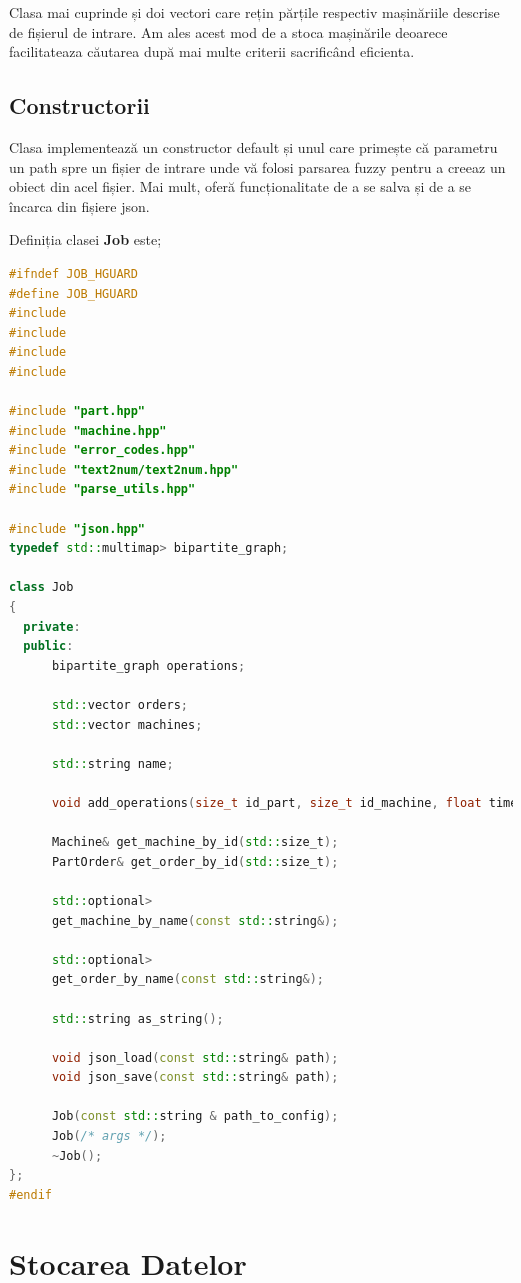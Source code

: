 \documentclass[12pt, twoside]{article}
\begin{document}
Clasa mai cuprinde și doi vectori care rețin părțile respectiv
mașinăriile descrise de fișierul de intrare. Am ales acest mod
de a stoca mașinările deoarece facilitateaza căutarea după mai
multe criterii sacrificând eficienta.

\subsection{Constructorii}

Clasa implementează un constructor default și unul care
primește că parametru un path spre un fișier de intrare
unde vă folosi parsarea fuzzy pentru a creeaz un obiect
din acel fișier. Mai mult, oferă funcționalitate de a se salva
și de a se încarca din fișiere json.


Definiția clasei \textbf{Job} este;

\begin{lstlisting}[language={C++},breaklines,frame={single}]
#ifndef JOB_HGUARD
#define JOB_HGUARD
#include 
#include 
#include 
#include 

#include "part.hpp"
#include "machine.hpp"
#include "error_codes.hpp"
#include "text2num/text2num.hpp"
#include "parse_utils.hpp"

#include "json.hpp"
typedef std::multimap> bipartite_graph;

class Job
{
  private:
  public:
      bipartite_graph operations; 
  
      std::vector orders;
      std::vector machines;
  
      std::string name;
    
      void add_operations(size_t id_part, size_t id_machine, float time);
  
      Machine& get_machine_by_id(std::size_t);
      PartOrder& get_order_by_id(std::size_t); 
  
      std::optional> 
      get_machine_by_name(const std::string&);
      
      std::optional> 
      get_order_by_name(const std::string&);
  
      std::string as_string();
  
      void json_load(const std::string& path);
      void json_save(const std::string& path);
  
      Job(const std::string & path_to_config);
      Job(/* args */);
      ~Job();
};
#endif
\end{lstlisting}


\section{Stocarea Datelor}
\end{document}
